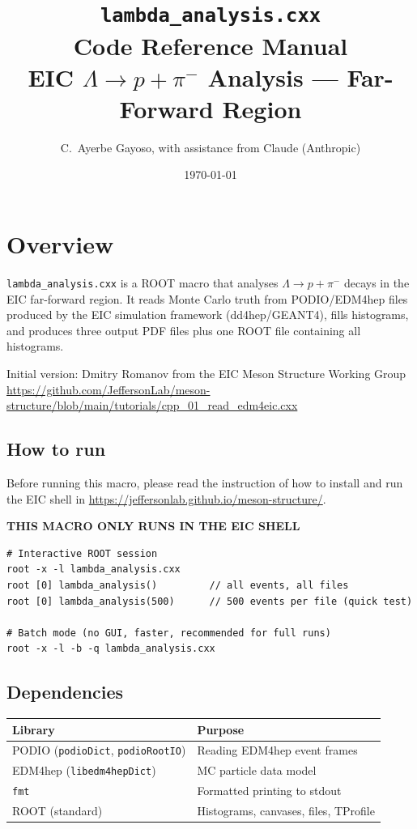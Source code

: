 \documentclass[11pt]{article}
\title{\textbf{\texttt{lambda\_analysis.cxx}\\Code Reference Manual}\\[6pt]
       \large EIC $\Lambda \to p + \pi^-$ Analysis --- Far-Forward Region}
\author{C.\ Ayerbe Gayoso, with assistance from Claude (Anthropic)}
\date{\today}
\begin{document}
\maketitle
\tableofcontents
\newpage

\section{Overview}

\texttt{lambda\_analysis.cxx} is a ROOT macro that analyses
$\Lambda \to p + \pi^-$ decays in the EIC far-forward region. It reads
Monte Carlo truth from PODIO/EDM4hep files produced by the EIC simulation
framework (dd4hep/GEANT4), fills histograms, and produces three output
PDF files plus one ROOT file containing all histograms. 

Initial version: Dmitry Romanov from the EIC Meson Structure Working Group
\url{ https://github.com/JeffersonLab/meson-structure/blob/main/tutorials/cpp_01_read_edm4eic.cxx}

\subsection{How to run}

Before running this macro, please read the instruction of how to install and run the EIC shell in \url{https://jeffersonlab.github.io/meson-structure/}. 

\textbf{THIS MACRO ONLY RUNS IN THE EIC SHELL}

\begin{lstlisting}
# Interactive ROOT session
root -x -l lambda_analysis.cxx
root [0] lambda_analysis()         // all events, all files
root [0] lambda_analysis(500)      // 500 events per file (quick test)

# Batch mode (no GUI, faster, recommended for full runs)
root -x -l -b -q lambda_analysis.cxx
\end{lstlisting}

\subsection{Dependencies}

\begin{center}
\begin{tabular}{ll}
\toprule
Library & Purpose \\
\midrule
PODIO (\texttt{podioDict}, \texttt{podioRootIO}) & Reading EDM4hep event frames \\
EDM4hep (\texttt{libedm4hepDict}) & MC particle data model \\
\texttt{fmt} & Formatted printing to stdout \\
ROOT (standard) & Histograms, canvases, files, TProfile \\
\bottomrule
\end{tabular}
\end{center}
\end{document}
